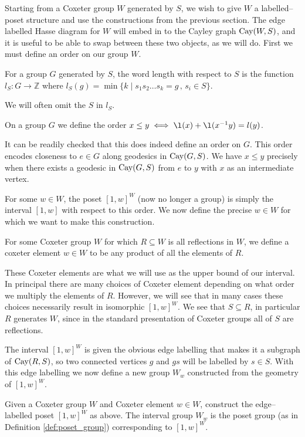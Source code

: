 \documentclass[class=article, crop=false]{standalone}
\begin{document}
Starting from a Coxeter group $W$ generated by $S$, we wish to give $W$ a labelled--poset structure and use the constructions from the previous section. The edge labelled Hasse diagram for $W$ will embed in to the Cayley graph $\text{Cay}(W,S)$, and it is useful to be able to swap between these two objects, as we will do. First we must define an order on our group $W$.
\begin{definition}
	For a group $G$ generated by $S$, the word length with respect to $S$ is the function $l_S:G\to \mathbb{Z}$ where $l_S(g) = \min\{k \mid s_1s_2\ldots s_k=g \,,\, s_i \in S \}$.
\end{definition}

We will often omit the $S$ in $l_S$.

\begin{definition}
	On a group $G$ we define the order $x \leq y \iff \l(x) + \l(x^{-1}y) = l(y)$.
\end{definition}

It can be readily checked that this does indeed define an order on $G$. This order encodes closeness to $e \in G$ along geodesics in $\text{Cay}(G,S)$. We have $x \leq y$ precisely when there exists a geodesic in $\text{Cay}(G, S)$ from $e$ to $y$ with $x$ as an intermediate vertex.

For some $w \in W$, the poset $[1,w]^W$ (now no longer a group) is simply the interval $[1,w]$ with respect to this order. We now define the precise $w \in W$ for which we want to make this construction.

\begin{definition}
	For some Coxeter group $W$ for which $R \subseteq W$ is all reflections in $W$, we define a coxeter element $w\in W$ to be any product of all the elements of $R$.
\end{definition}

These Coxeter elements are what we will use as the upper bound of our interval. In principal there are many choices of Coxeter element depending on what order we multiply the elements of $R$. However, we will see that in many cases these choices necessarily result in isomorphic $[1,w]^W$. We see that $S \subseteq R$, in particular $R$ generates $W$, since in the standard presentation of Coxeter groups all of $S$ are reflections.

The interval $[1,w]^W$ is given the obvious edge labelling that makes it a subgraph of $\text{Cay}(R,S)$, so two connected vertices $g$ and $gs$ will be labelled by $s \in S$. With this edge labelling we now define a new group $W_w$ constructed from the geometry of $[1,w]^W$.

\begin{definition}
	Given a Coxeter group $W$ and Coxeter element $w\in W$, construct the edge--labelled poset $[1,w]^W$ as above. The interval group $W_w$ is the poset group (as in Definition \ref{def:poset_group}) corresponding to $[1,w]^W$.
\end{definition}
\end{document}
